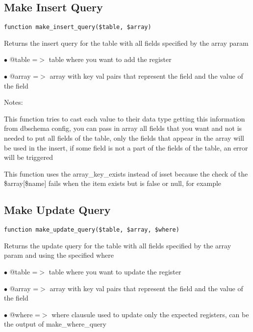 \documentclass[a4paper]{book}
\begin{document}
\hypertarget{toc262}{}
\subsection{Make Insert Query}

\begin{lstlisting}
function make_insert_query($table, $array)
\end{lstlisting}

Returns the insert query for the table with all fields specified by the
array param

\begin{compactitem}
\item[\color{myblue}$\bullet$] @table =$>$ table where you want to add the register
\item[\color{myblue}$\bullet$] @array =$>$ array with key val pairs that represent the field and the value
          of the field
\end{compactitem}

Notes:

This function tries to cast each value to their data type getting this
information from dbschema config, you can pass in array all fields that
you want and not is needed to put all fields of the table, only the
fields that appear in the array will be used in the insert, if some
field is not a part of the fields of the table, an error will be
triggered

This function uses the array\_key\_exists instead of isset because the
check of the \$array[\$name] fails when the item exists but is false or
null, for example

\hypertarget{toc263}{}
\subsection{Make Update Query}

\begin{lstlisting}
function make_update_query($table, $array, $where)
\end{lstlisting}

Returns the update query for the table with all fields specified by the
array param and using the specified where

\begin{compactitem}
\item[\color{myblue}$\bullet$] @table =$>$ table where you want to update the register
\item[\color{myblue}$\bullet$] @array =$>$ array with key val pairs that represent the field and the value of
          the field
\item[\color{myblue}$\bullet$] @where =$>$ where clausule used to update only the expected registers, can be
          the output of make\_where\_query
\end{compactitem}
\end{document}

